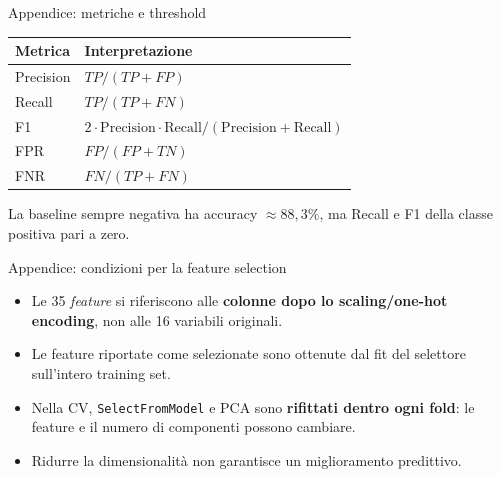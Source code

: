 \documentclass[10pt,aspectratio=169]{beamer}
\begin{document}
\appendix
\begin{frame}{Appendice: metriche e threshold}
\small
\begin{tabular}{@{}ll@{}}\toprule
Metrica & Interpretazione\\\midrule
Precision & $TP/(TP+FP)$\\
Recall & $TP/(TP+FN)$\\
F1 & $2\cdot\mathrm{Precision}\cdot\mathrm{Recall}/(\mathrm{Precision}+\mathrm{Recall})$\\
FPR & $FP/(FP+TN)$\\
FNR & $FN/(TP+FN)$\\\bottomrule\end{tabular}
\par\vspace{1em}
{\small La baseline sempre negativa ha accuracy $\approx88,3\%$, ma Recall e F1 della classe positiva pari a zero.}
\end{frame}
\begin{frame}{Appendice: condizioni per la feature selection}
\begin{itemize}\setlength{\itemsep}{1em}
\item Le 35 \emph{feature} si riferiscono alle \textbf{colonne dopo lo scaling/one-hot encoding}, non alle 16 variabili originali.
\item Le feature riportate come selezionate sono ottenute dal fit del selettore sull'intero training set.
\item Nella CV, \texttt{SelectFromModel} e PCA sono \textbf{rifittati dentro ogni fold}: le feature e il numero di componenti possono cambiare.
\item Ridurre la dimensionalità non garantisce un miglioramento predittivo.
\end{itemize}
\end{frame}
\end{document}
